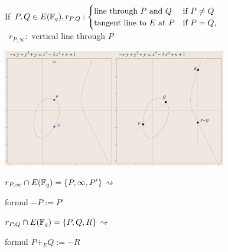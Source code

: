 \documentclass[10pt,handout]{beamer} %
\begin{document}
\begin{frame}

If $P,Q\in E(\mathbb F_q), r_{P,Q}:\begin{cases}
                     \text{line through $P$ and }Q &\text{if }P\neq Q\\
                     \text{tangent line to $E$ at }P &\text{if }P=Q,
                    \end{cases}$\\ \ \hfill $r_{P,\infty}:$ vertical line through $P$

\begin{center}
\includegraphics[width=4.9cm]{images/ad15.pdf}\includegraphics[width=4.9cm]{images/add7.pdf}\pause
\end{center}

{$r_{P,\infty}\cap E(\mathbb F_q)=\{P,\infty,P'\}$}\hfill$\rightsquigarrow$
{\begin{beamercolorbox}[shadow=true,center,rounded=true,wd=2cm]{formul}
             $-P:=P'$
            \end{beamercolorbox}}\medskip

{$r_{P,Q}\cap E(\mathbb F_q)=\{P,Q,R\}$}\hfill$\rightsquigarrow$
{\begin{beamercolorbox}[shadow=true,center,rounded=true,wd=2.9cm]{formul}
$P+_E Q:=-R$
            \end{beamercolorbox}}
\end{frame}
\end{document}
